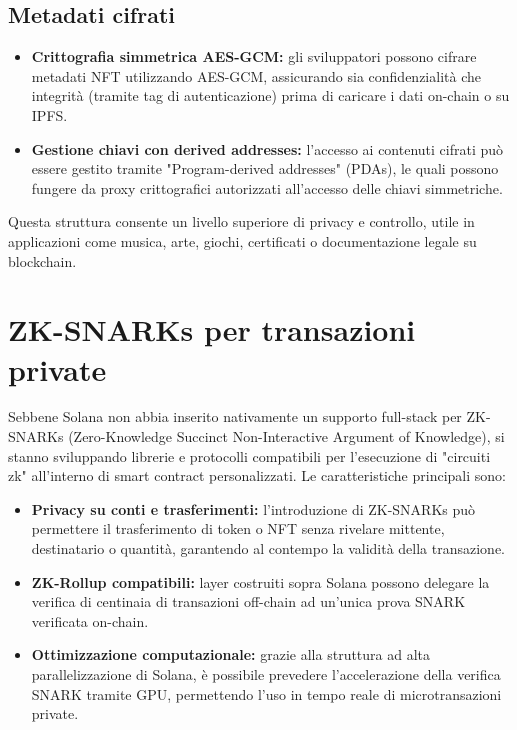 \documentclass[a4paper,12pt]{report}
\begin{document}
	\subsection{Metadati cifrati}
	\begin{itemize}
		\item \textbf{Crittografia simmetrica AES-GCM:} gli sviluppatori possono cifrare metadati NFT utilizzando AES-GCM, assicurando sia confidenzialità che integrità (tramite tag di autenticazione) prima di caricare i dati on-chain o su IPFS.
		\item \textbf{Gestione chiavi con derived addresses:} l’accesso ai contenuti cifrati può essere gestito tramite "Program-derived addresses" (PDAs), le quali possono fungere da proxy crittografici autorizzati all’accesso delle chiavi simmetriche.
	\end{itemize}
	Questa struttura consente un livello superiore di privacy e controllo, utile in applicazioni come musica, arte, giochi, certificati o documentazione legale su blockchain.
	
	\section{ZK-SNARKs per transazioni private}
	Sebbene Solana non abbia inserito nativamente un supporto full-stack per ZK-SNARKs (Zero-Knowledge Succinct Non-Interactive Argument of Knowledge), si stanno sviluppando librerie e protocolli compatibili per l’esecuzione di "circuiti zk" all’interno di smart contract personalizzati. Le caratteristiche principali sono:
	\begin{itemize}
		\item \textbf{Privacy su conti e trasferimenti:} l’introduzione di ZK-SNARKs può permettere il trasferimento di token o NFT senza rivelare mittente, destinatario o quantità, garantendo al contempo la validità della transazione.
		\item \textbf{ZK-Rollup compatibili:} layer costruiti sopra Solana possono delegare la verifica di centinaia di transazioni off-chain ad un’unica prova SNARK verificata on-chain.
		\item \textbf{Ottimizzazione computazionale:} grazie alla struttura ad alta parallelizzazione di Solana, è possibile prevedere l’accelerazione della verifica SNARK tramite GPU, permettendo l’uso in tempo reale di microtransazioni private.
	\end{itemize}
	
\end{document}
